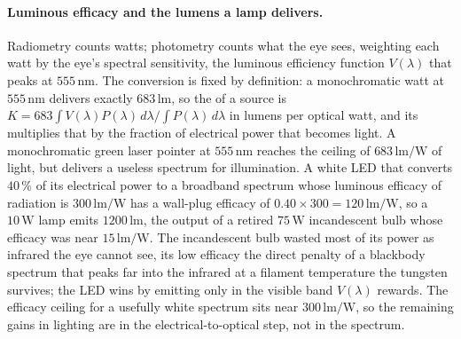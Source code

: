 \paragraph{Luminous efficacy and the lumens a lamp delivers.} Radiometry counts
watts; photometry counts what the eye sees, weighting each watt by the eye's
spectral sensitivity, the luminous efficiency function $V(\lambda)$ that peaks at
$555\,\si{\nano\meter}$. The conversion is fixed by definition: a
monochromatic watt at $555\,\si{\nano\meter}$ delivers exactly
$683\,\text{lm}$, so the  of a source is
$K = 683\int V(\lambda) P(\lambda)\,d\lambda / \int P(\lambda)\,d\lambda$ in lumens
per optical watt, and its  multiplies that by the
fraction of electrical power that becomes light. A monochromatic green laser
pointer at $555\,\si{\nano\meter}$ reaches the ceiling of $683\,\text{lm}/\si{
\watt}$ of light, but delivers a useless spectrum for illumination. A white LED
that converts $40\,\%$ of its electrical power to a broadband spectrum whose
luminous efficacy of radiation is $300\,\text{lm}/\si{\watt}$ has a wall-plug
efficacy of $0.40\times 300 = 120\,\text{lm}/\si{\watt}$, so a $10\,\si{\watt}$
lamp emits $1200\,\text{lm}$, the output of a retired $75\,\si{\watt}$
incandescent bulb whose efficacy was near $15\,\text{lm}/\si{\watt}$. The
incandescent bulb wasted most of its power as infrared the eye cannot see, its low
efficacy the direct penalty of a blackbody spectrum that peaks far into the
infrared at a filament temperature the tungsten survives; the LED wins by emitting
only in the visible band $V(\lambda)$ rewards. The efficacy ceiling for a
usefully white spectrum sits near $300\,\text{lm}/\si{\watt}$, so the remaining
gains in lighting are in the electrical-to-optical step, not in the spectrum.

